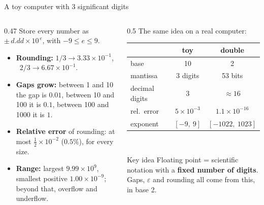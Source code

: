 \documentclass[aspectratio=169]{beamer}
\begin{document}
\begin{frame}{A toy computer with 3 significant digits}
\begin{columns}[T]
\begin{column}{0.47\textwidth}
\small
Store every number as $\pm\, d.dd \times 10^{\,e}$, with $-9 \le e \le 9$.
\begin{itemize}\footnotesize
  \item \textbf{Rounding:} $1/3 \to 3.33\times10^{-1}$, \ $2/3 \to 6.67\times10^{-1}$.
  \item \textbf{Gaps grow:} between 1 and 10 the gap is $0.01$, between 10 and 100 it is $0.1$, between 100 and 1000 it is $1$.
  \item \textbf{Relative error} of rounding: at most $\tfrac12\times10^{-2}$ ($0.5\%$), for every size.
  \item \textbf{Range:} largest $9.99\times10^{9}$, smallest positive $1.00\times10^{-9}$; beyond that, overflow and underflow.
\end{itemize}
\end{column}
\begin{column}{0.5\textwidth}
\centering
\small The same idea on a real computer:\\[4pt]
\scriptsize
\setlength{\tabcolsep}{3pt}
\begin{tabular}{lcc}
\toprule
 & toy & double \\
\midrule
base & 10 & 2 \\
mantissa & 3 digits & 53 bits \\
decimal digits & 3 & $\approx 16$ \\
rel.\ error & $5\times10^{-3}$ & $1.1\times10^{-16}$ \\
exponent & $[-9,\ 9]$ & $[-1022,\ 1023]$ \\
\bottomrule
\end{tabular}\\[8pt]
\begin{alertblock}{Key idea}
\scriptsize Floating point = scientific notation with a \textbf{fixed number of digits}. Gaps, $\varepsilon$ and rounding all come from this, in base 2.
\end{alertblock}
\end{column}
\end{columns}
\end{frame}
\end{document}
